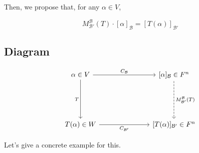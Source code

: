 \documentclass[12pt]{article}
\def\B{\mathcal B}
\begin{document}
  Then, we propose that, for any $\alpha \in V$,

  \[
    M_{\B'}^{\B} (T) \cdot [\alpha]_{\B} = [T(\alpha)]_{\B'}
  \]

  \subsection{Diagram}
  \[
    \begin{tikzcd}[sep=large]
      {\alpha \in V} && { [\alpha]_{\mathcal B} \in F^n} \\
      \\
      {T(\alpha) \in W} && {[T(\alpha)]_{\mathcal B'} \in F^n}
      \arrow["{C_{\mathcal B}}", from=1-1, to=1-3]
      \arrow["T"', from=1-1, to=3-1]
      \arrow["{C_{\mathcal B'}}"', from=3-1, to=3-3]
      \arrow["{M_{\mathcal B'}^{\mathcal B}(T)}", dashed, from=1-3, to=3-3]
    \end{tikzcd}
  \]

  Let's give a concrete example for this.
\end{document}
